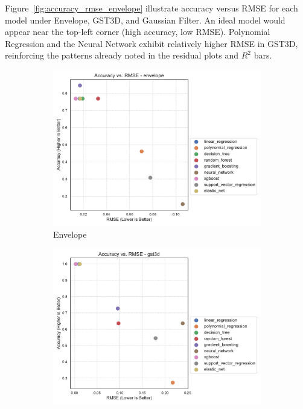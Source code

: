 Figure~\ref{fig:accuracy_rmse_envelope} illustrate accuracy versus \ac{RMSE} for each model under Envelope, \ac{GST3D}, and Gaussian Filter.
An ideal model would appear near the top-left corner (high accuracy, low \ac{RMSE}).
Polynomial Regression and the Neural Network exhibit relatively higher \ac{RMSE} in \ac{GST3D}, reinforcing the patterns already noted in the residual plots and $R^2$ bars.

\begin{figure}[htbp]
    \centering
    \begin{subfigure}[t]{0.32\textwidth}
        \includegraphics[width=\textwidth]{assets/images/05/accuracy_by_rmse_per_model_envelope}
        \caption{Envelope}
    \end{subfigure}
    \hfill
    \begin{subfigure}[t]{0.32\textwidth}
        \includegraphics[width=\textwidth]{assets/images/05/accuracy_by_rmse_per_model_gst3d}

\end{subfigure}
\end{figure}
